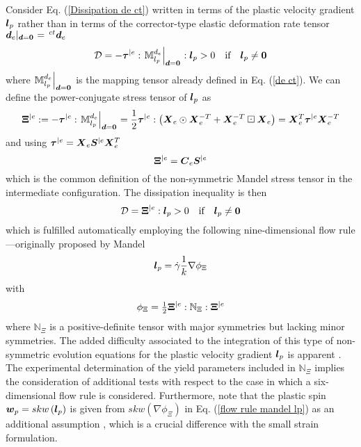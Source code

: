 \documentclass[preprint,review,12pt,sort&compress]{elsarticle}%
\newcommand{\doo}[0]{\scriptsize\mathbf{d} = \mathbf{0}\normalsize\mathbf{}}
\renewcommand{\mathbf}[1]{\mbox{\boldmath $#1$ \unboldmath}  \!\!}
\begin{document}
Consider Eq. (\ref{Dissipation de ct}) written in terms of the plastic
velocity gradient $\mathbf{l}_{p}$ rather than in terms of the corrector-type
elastic deformation rate tensor $\mathbf{d}_{e}|_{%
\doo
}=\,^{ct}\mathbf{d}_{e}$%
\begin{equation}
\mathcal{D}=-\mathbf{\tau}^{|e}:\left.  \mathbb{M}_{l_{p}}^{d_{e}}\right\vert
_{%
\doo
}:\mathbf{l}_{p}>0\quad\text{if}\quad\mathbf{l}_{p}\neq\mathbf{0}%
\end{equation}
where $\left.  \mathbb{M}_{l_{p}}^{d_{e}}\right\vert _{%
\doo
}$ is the mapping tensor already defined in Eq. (\ref{de ct}). We can define
the power-conjugate stress tensor of $\mathbf{l}_{p}$ as%
\begin{equation}
\mathbf{\Xi}^{|e}:=-\mathbf{\tau}^{|e}:\left.  \mathbb{M}_{l_{p}}^{d_{e}%
}\right\vert _{%
\doo
}=\frac{1}{2}\mathbf{\tau}^{|e}:\left(  \mathbf{X}_{e}\odot\mathbf{X}_{e}%
^{-T}+\mathbf{X}_{e}^{-T}\boxdot\mathbf{X}_{e}\right)  =\mathbf{X}_{e}%
^{T}\mathbf{\tau}^{|e}\mathbf{X}_{e}^{-T} \label{mandel tau}%
\end{equation}
and using $\mathbf{\tau}^{|e}=\mathbf{X}_{e}\mathbf{S}^{|e}\mathbf{X}_{e}^{T}$%
\begin{equation}
\mathbf{\Xi}^{|e}=\mathbf{C}_{e}\mathbf{S}^{|e} \label{mandel S}%
\end{equation}
which is the common definition of the non-symmetric Mandel stress tensor in
the intermediate configuration. The dissipation inequality is then%
\begin{equation}
\mathcal{D}=\mathbf{\Xi}^{|e}:\mathbf{l}_{p}>0\quad\text{if}\quad
\mathbf{l}_{p}\neq\mathbf{0} \label{Dissipation mandel}%
\end{equation}
which is fulfilled automatically employing the following nine-dimensional flow
rule---originally proposed by Mandel \cite{Mandel74}%
\begin{equation}
\mathbf{l}_{p}=\dot{\gamma}\frac{1}{k}\nabla\phi_{\Xi}
\label{flow rule mandel lp}%
\end{equation}
with%
\begin{equation}
\phi_{\Xi}=\tfrac{1}{2}\mathbf{\Xi}^{|e}:\mathbb{N}_{\Xi}:\mathbf{\Xi}^{|e}%
\end{equation}
where $\mathbb{N}_{\Xi}$ is a positive-definite tensor with major symmetries
but lacking minor symmetries. The added difficulty associated to the
integration of this type of non-symmetric evolution equations for the plastic
velocity gradient $\mathbf{l}_{p}$ is apparent \cite{SansourKarsajSoric06}.
The experimental determination of the yield parameters included in
$\mathbb{N}_{\Xi}$ implies the consideration of additional tests with respect
to the case in which a six-dimensional flow rule is considered. Furthermore,
note that the plastic spin $\mathbf{w}_{p}=skw\left(  \mathbf{l}_{p}\right)  $
is given from $skw(\nabla\phi_{\Xi})$ in Eq. (\ref{flow rule mandel lp}) as an
additional assumption \cite{Lubliner86}, which is a crucial difference with
the small strain formulation.
\end{document}
